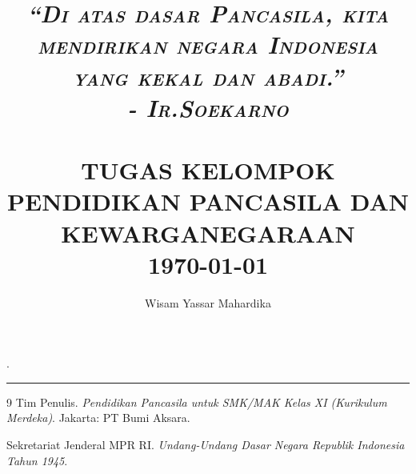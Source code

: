 \documentclass[11pt,a4paper]{article}
\title{	\normalsize \textsc{\textit{``Di atas dasar Pancasila, kita mendirikan negara Indonesia yang kekal dan abadi.''\\- Ir.Soekarno } } 	%
		 	\\[2.0cm]								%
			\HRule{0.5pt} \\						%
			\LARGE \textbf{\uppercase{Tugas Kelompok Pendidikan Pancasila dan Kewarganegaraan}}	%
			\HRule{2pt} \\ [0.5cm]		%
			\normalsize \today			%
		}
\author{
		Wisam Yassar Mahardika\\	
}
\makeatletter
\def\printtitle{%
    {\centering \@title\par}}
\def\printauthor{%
    {\centering \large \@author}}
\makeatother
\begin{document}
\setlength{\headheight}{13.59999pt}.

\printtitle
  	\vfill
\printauthor
\thispagestyle{empty}
\newpage

\tableofcontents
\vspace{2cm}
\hrule
\vspace{2cm}
\newpage
{}






\begin{thebibliography}{9}
    Tim Penulis.
    \newblock \textit{Pendidikan Pancasila untuk SMK/MAK Kelas XI (Kurikulum Merdeka)}.
    \newblock Jakarta: PT Bumi Aksara.

    Sekretariat Jenderal MPR RI.
    \newblock \textit{Undang-Undang Dasar Negara Republik Indonesia Tahun 1945}.
\end{thebibliography}
\end{document}
